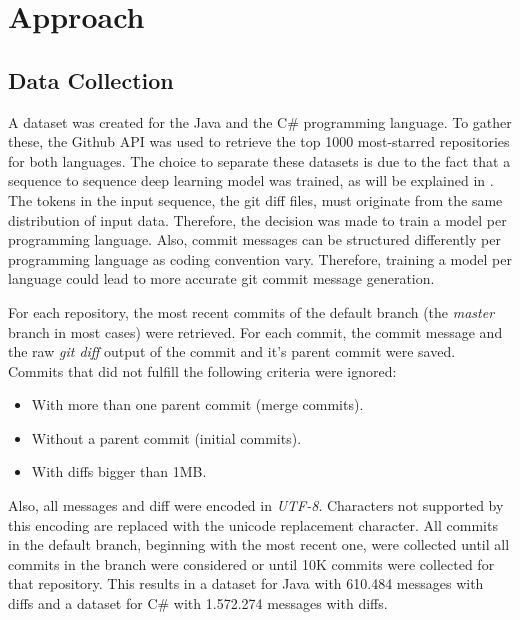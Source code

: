 \section{Approach}\label{sec:methodology}

\subsection{Data Collection}
A dataset was created for the Java and the C\# programming language. To gather these, the Github API was used to retrieve the top 1000 most-starred repositories for both languages. The choice to separate these datasets is due to the fact that a sequence to sequence deep learning model was trained, as will be explained in . The tokens in the input sequence, the git diff files, must originate from the same distribution of input data. Therefore, the decision was made to train a model per programming language. Also, commit messages can be structured differently per programming language as coding convention vary. Therefore, training a model per language could lead to more accurate git commit message generation.


For each repository, the most recent commits of the default branch (the \textit{master} branch in most cases) were retrieved. For each commit, the commit message and the raw \textit{git diff} output of the commit and it's parent commit were saved. Commits that did not fulfill the following criteria were ignored:
\begin{itemize}
    \item With more than one parent commit (merge commits).
    \item Without a parent commit (initial commits).
    \item With diffs bigger than 1MB. 
\end{itemize}
Also, all messages and diff were encoded in \textit{UTF-8}. Characters not supported by this encoding are replaced with the unicode replacement character. All commits in the default branch, beginning with the most recent one, were collected until all commits in the branch were considered or until 10K commits were collected for that repository.
This results in a dataset for Java with 610.484 messages with diffs and a dataset for C\# with 1.572.274 messages with diffs.

